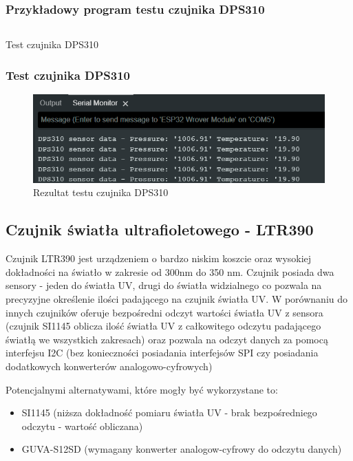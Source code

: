 \documentclass[12pt,a4paper]{article}
\begin{document}
\subsubsection{Przykładowy program testu czujnika DPS310}

\begin{code}[H]
\inputminted[frame=lines,baselinestretch=1,breaklines,linenos,xleftmargin=1.5em]{c}{../proj/dps310-test/dps310-test.ino}

\caption{Test czujnika DPS310}
\end{code}

\subsubsection{Test czujnika DPS310}
\begin{figure}[H]
    \centering
    \includegraphics[width=\textwidth]{dps310-test.png}
    \caption{Rezultat testu czujnika DPS310}
\end{figure}

\subsection{Czujnik światła ultrafioletowego - LTR390}

Czujnik LTR390 jest urządzeniem o bardzo niskim koszcie oraz wysokiej dokładności na światło w zakresie od 300nm do 350 nm. Czujnik posiada dwa sensory - jeden do światła UV, drugi do światła widzialnego 
co pozwala na precyzyjne określenie ilości padającego na czujnik światła UV. W porównaniu do innych czujników oferuje bezpośredni odczyt wartości światła UV z sensora (czujnik SI1145 oblicza ilość światła UV z całkowitego odczytu padającego światłą we wszystkich zakresach) 
oraz pozwala na odczyt danych za pomocą interfejsu I2C (bez konieczności posiadania interfejsów SPI czy posiadania dodatkowych konwerterów analogowo-cyfrowych) 

Potencjalnymi alternatywami, które mogły być wykorzystane to:
\begin{itemize}
    \item SI1145 (niższa dokładność pomiaru światła UV - brak bezpośredniego odczytu - wartość obliczana)
    \item GUVA-S12SD (wymagany konwerter analogow-cyfrowy do odczytu danych)
\end{itemize}
\end{document}
